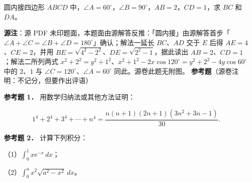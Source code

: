 \begin{question}
圆内接四边形 $ABCD$ 中，$\angle A=60^\circ$，$\angle B=90^\circ$，$AB=2$，$CD=1$，求 $BC$ 和 $DA$。

\begin{gktip}
\textbf{源注}：源 PDF 未印题面，本题面由源解答反推：「圆内接」由源解答首步「$\angle A+\angle C=\angle B+\angle D=180^\circ$」确认；解法一延长 $BC$、$AD$ 交于 $E$ 后得 $AE=4$、$CE=2$，并用 $BE=\sqrt{4^2-2^2}$、$DE=\sqrt{2^2-1}$，据此读出 $AB=2$、$CD=1$；解法二所列两式 $x^2+2^2=y^2+1^2$、$x^2+1^2-2x\cos120^\circ=y^2+2^2-4y\cos60^\circ$ 中的 $2$、$1$ 与 $\angle C=120^\circ$、$\angle A=60^\circ$ 同此。源卷此题无附图。
\textbf{参考题}（源卷注明：不记分，但要作出评语）
\end{gktip}

\textbf{参考题 1．} 用数学归纳法或其他方法证明：

\nopagebreak[4]
\[
1^4+2^4+3^4+\cdots+n^4=\frac{n(n+1)(2n+1)(3n^2+3n-1)}{30}.
\]

\textbf{参考题 2．} 计算下列积分：

（1）$\int_0^1 x\mathrm e^{-x}\,dx$；

（2）$\int_0^a x^2\sqrt{a^2-x^2}\,dx$。

\end{question}